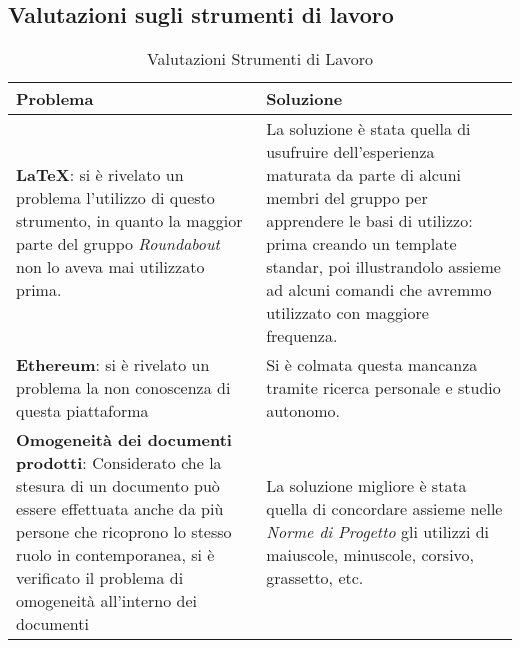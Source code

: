 \subsection{Valutazioni sugli strumenti di lavoro}
	\begin{longtable}{ 
			>{\centering}p{} 
			>{\centering\arraybackslash}p{} }
		
		\caption {Valutazioni Strumenti di Lavoro}		\\
		
		\textbf{\color{white}Problema} &
		\textbf{\color{white}Soluzione}
		\tabularnewline  
		\endhead
		
		\textbf{\LaTeX{}}: si è rivelato un problema l'utilizzo di questo strumento, in quanto la maggior parte del gruppo \textit{Roundabout} non lo aveva mai utilizzato prima. & La soluzione è stata quella di usufruire dell'esperienza maturata da parte di alcuni membri del gruppo per apprendere le basi di utilizzo: prima creando un template standar, poi illustrandolo assieme ad alcuni comandi che avremmo utilizzato con maggiore frequenza. \\
		
		\textbf{Ethereum}: si è rivelato un problema la non conoscenza di questa piattaforma & Si è colmata questa mancanza tramite ricerca personale e studio autonomo. \\
		
		\textbf{Omogeneità dei documenti prodotti}: Considerato che la stesura di un documento può essere effettuata anche da più persone che ricoprono lo stesso ruolo in contemporanea, si è verificato il problema di omogeneità all'interno dei documenti & La soluzione migliore è stata quella di concordare assieme nelle \textit{Norme di Progetto} gli utilizzi di maiuscole, minuscole, corsivo, grassetto, etc. \\
		
	\end{longtable}
